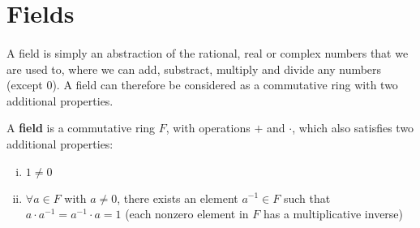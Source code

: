 \documentclass[../abstract_algebra.tex]{subfiles}
\begin{document}
    \section{Fields}
        \paragraph{}
        A field is simply an abstraction of the rational, real or complex numbers that we are used to, where we can add, substract, multiply and divide any numbers (except 0).
        A field can therefore be considered as a commutative ring with two additional properties.
        \begin{definition}
            A \textbf{field} is a commutative ring $F$, with operations $+$ and $\cdot$, which also satisfies two additional properties:
            \begin{enumerate}[(i)]
                \item $1\neq0$
                \item $\forall a\in F$ with $a\neq0$, there exists an element $a^{-1}\in F$ such that $a\cdot a^{-1}=a^{-1}\cdot a=1$ (each nonzero element in $F$ has a multiplicative inverse)
            \end{enumerate}
        \end{definition}
\end{document}
